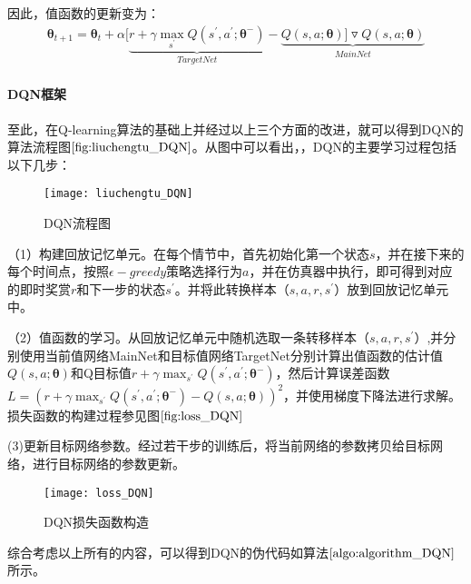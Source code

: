 因此，值函数的更新变为：
\begin{equation}
\begin{aligned}
\mathbf{\theta}_{t+1}=\mathbf{\theta}_{t}+\alpha[\underbrace{r+\gamma \max_{s^{'}}Q(s^{'},a^{'};\mathbf{\theta^{-}})}_{TargetNet}-\underbrace{Q(s,a;\mathbf{\theta})]\triangledown Q(s,a;\mathbf{\theta})}_{MainNet}
\end{aligned}
\end{equation}

 \paragraph{DQN框架}
 至此，在Q-learning算法的基础上并经过以上三个方面的改进，就可以得到DQN的算法流程图$\ref{fig:liuchengtu_DQN}$。从图中可以看出，，DQN的主要学习过程包括以下几步：
\begin{figure}[htbp]
\centering
\texttt{[image: liuchengtu\_DQN]}
\caption{DQN流程图}
\label{fig:liuchengtu_DQN}
\end{figure}

（1）构建回放记忆单元。在每个情节中，首先初始化第一个状态$s$，并在接下来的每个时间点，按照$\epsilon-greedy$策略选择行为$a$，并在仿真器中执行，即可得到对应的即时奖赏$r$和下一步的状态$s^{'}$。并将此转换样本（$s,a,r,s^{'}$）放到回放记忆单元中。

（2）值函数的学习。从回放记忆单元中随机选取一条转移样本（$s,a,r,s^{'}$）,并分别使用当前值网络MainNet和目标值网络TargetNet分别计算出值函数的估计值 $Q(s,a;\mathbf{\theta})$和Q目标值$r+\gamma \max_{s^{'}}Q(s^{'},a^{'};\mathbf{\theta^{-}})$，然后计算误差函数$L=(r+\gamma \max_{s^{'}}Q(s^{'},a^{'};\mathbf{\theta^{-}})-Q(s,a;\mathbf{\theta}))^{2}$，并使用梯度下降法进行求解。损失函数的构建过程参见图$\ref{fig:loss_DQN}$

(3)更新目标网络参数。经过若干步的训练后，将当前网络的参数拷贝给目标网络，进行目标网络的参数更新。


\begin{figure}[htbp]
\centering
\texttt{[image: loss\_DQN]}
\caption{DQN损失函数构造}
\label{fig:loss_DQN}
\end{figure}

综合考虑以上所有的内容，可以得到DQN的伪代码如算法$\ref{algo:algorithm_DQN}$所示。


